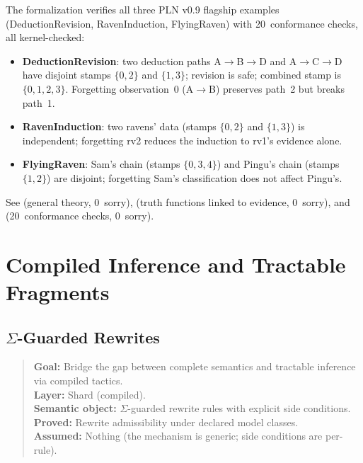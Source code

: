 \documentclass[11pt,openany]{report}
\begin{document}
The formalization verifies all three PLN v0.9 flagship examples
(DeductionRevision, RavenInduction, FlyingRaven) with 20~conformance
checks, all kernel-checked:

\begin{itemize}
\item \textbf{DeductionRevision}: two deduction paths A$\to$B$\to$D
  and A$\to$C$\to$D have disjoint stamps $\{0,2\}$ and $\{1,3\}$;
  revision is safe; combined stamp is $\{0,1,2,3\}$.
  Forgetting observation~0 (A$\to$B) preserves path~2 but breaks path~1.

\item \textbf{RavenInduction}: two ravens' data (stamps $\{0,2\}$ and
  $\{1,3\}$) is independent; forgetting rv2 reduces the induction to
  rv1's evidence alone.

\item \textbf{FlyingRaven}: Sam's chain (stamps $\{0,3,4\}$) and
  Pingu's chain (stamps $\{1,2\}$) are disjoint; forgetting Sam's
  classification does not affect Pingu's.
\end{itemize}

\noindent
See  (general
theory, 0~sorry),
 (truth
functions linked to evidence, 0~sorry), and
 (20~conformance
checks, 0~sorry).


\part{Compiled Inference and Tractable Fragments}
\label{part:compiled}

\chapter{\texorpdfstring{$\Sigma$}{Sigma}-Guarded Rewrites}
\label{ch:sigma-rewrites}

\begin{quote}\small
\textbf{Goal:} Bridge the gap between complete semantics and tractable inference via compiled tactics.\\
\textbf{Layer:} Shard (compiled).\\
\textbf{Semantic object:} $\Sigma$-guarded rewrite rules with explicit side conditions.\\
\textbf{Proved:} Rewrite admissibility under declared model classes.\\
\textbf{Assumed:} Nothing (the mechanism is generic; side conditions are per-rule).
\end{quote}
\end{document}

